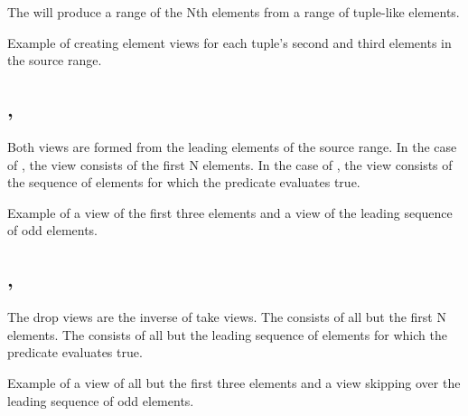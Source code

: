 The  will produce a range of the Nth elements from a range of tuple-like elements.

\begin{box-note}
\footnotesize Example of creating element views for each tuple's second and third elements in the source range.
\tcblower
{}
\end{box-note}

\subsection{\texorpdfstring{, }{\texttt{std::views::take}, \texttt{std::views::take\_while}}}

Both views are formed from the leading elements of the source range. In the case of , the view consists of the first N elements. In the case of , the view consists of the sequence of elements for which the predicate evaluates true.

\begin{box-note}
\footnotesize Example of a view of the first three elements and a view of the leading sequence of odd elements.
\tcblower
{}
\end{box-note}

\subsection{\texorpdfstring{, }{\texttt{std::views::drop}, \texttt{std::views::drop\_while}}}

The drop views are the inverse of take views.
The  consists of all but the first N elements.
The  consists of all but the leading sequence of elements for which the predicate evaluates true.

\begin{box-note}
\footnotesize Example of a view of all but the first three elements and a view skipping over the leading sequence of odd elements.
\tcblower
{}
\end{box-note}

\subsection{\texorpdfstring{}{\texttt{std::views::filter}}}

